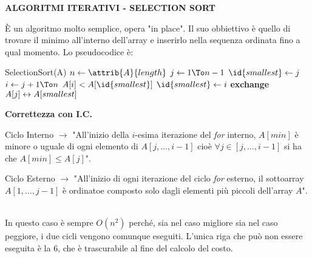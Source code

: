 \documentclass[8pt]{extarticle}
\begin{document}
\begin{formulario}
		\begin{tcenter}
\textbf{ALGORITMI ITERATIVI - SELECTION SORT}
		\end{tcenter}
È un algoritmo molto semplice, opera "in place". Il suo obbiettivo è quello di trovare il minimo all'interno dell'array e inserirlo nella sequenza ordinata fino a qual momento. Lo pseudocodice è: \\		
		\begin{code}{SelectionSort(A)}
\li $n\la\attrib{A}{length}$
\li \For $j\la1 \To n-1$ \Do
	\li $\id{smallest}\la j$
	\li \For $i \la j+1 \To n$ \Do
		\li \If $A[i]<A[\id{smallest}]$ \Then
			\li $\id{smallest}\la i$
		\End
	\End
	\li \bf{exchange }$A[j]\leftrightarrow A[smallest]$
		\end{code}				
\textbf{Correttezza con I.C.}
		\begin{descr}{1}
\item[Ciclo Interno] $\rightarrow$ "All'inizio della $i$-esima iterazione del \textit{for} interno, $A[min]$ è minore o uguale di ogni elemento di $A[j,\dots,i-1]$ cioè $\forall j\in [j,\dots,i-1]$ si ha che $A[min]\leq A[j]$". 
\item[Ciclo Esterno] $\rightarrow$ "All'inizio di ogni iterazione del ciclo \textit{for} esterno, il sottoarray $A[1,\dots,j-1]$ è ordinatoe composto solo dagli elementi più piccoli dell'array $A$".
		\end{descr}
\\
In questo caso è sempre $O(n^2)$ perché, sia nel caso migliore sia nel caso peggiore, i due cicli  vengono comunque eseguiti. L'unica riga che può non essere eseguita è la 6, che è trascurabile al fine del calcolo del costo.\\
\myRule


\end{formulario}
\end{document}
